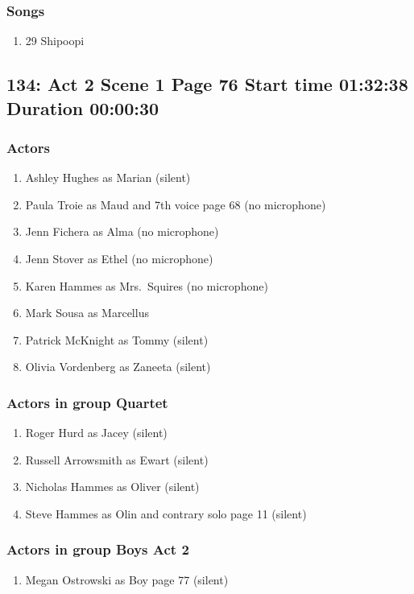 \subsubsection{Songs}
\begin{enumerate}
\item 29 Shipoopi
\end{enumerate}
\subsection{134: Act 2 Scene 1 Page 76 Start time 01:32:38 Duration 00:00:30}

\subsubsection{Actors}
\begin{enumerate}
\item Ashley Hughes as Marian (silent)
\item Paula Troie as Maud and 7th voice page 68 (no microphone)
\item Jenn Fichera as Alma (no microphone)
\item Jenn Stover as Ethel (no microphone)
\item Karen Hammes as Mrs.~Squires (no microphone)
\item Mark Sousa as Marcellus
\item Patrick McKnight as Tommy (silent)
\item Olivia Vordenberg as Zaneeta (silent)
\end{enumerate}
\subsubsection{Actors in group Quartet}
\begin{enumerate}
\item Roger Hurd as Jacey (silent)
\item Russell Arrowsmith as Ewart (silent)
\item Nicholas Hammes as Oliver (silent)
\item Steve Hammes as Olin and contrary solo page 11 (silent)
\end{enumerate}
\subsubsection{Actors in group Boys Act 2}
\begin{enumerate}
\item Megan Ostrowski as Boy page 77 (silent)
\end{enumerate}

